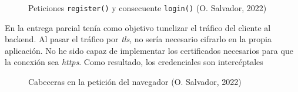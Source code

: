 \documentclass[11pt]{article}
\begin{document}
\begin{flushleft}
		\begin{figure}[htb]
			\centering
			\caption{Peticiones \texttt{register()} y consecuente \texttt{login()} (O. Salvador, 2022)}
		\end{figure}
	
	En la entrega parcial tenía como objetivo tunelizar el tráfico del cliente al backend. Al pasar el tráfico por \textit{\acrshort{tls}}, no sería necesario cifrarlo en la propia aplicación. No he sido capaz de implementar los certificados necesarios para que la conexión sea \textit{\acrshort{https}}. Como resultado, los credenciales son intercéptales
	\linebreak
	
	\begin{figure}[htb]
		\centering
		\caption{Cabeceras en la petición del navegador (O. Salvador, 2022)}
	\end{figure}
	

\end{flushleft}
\end{document}
